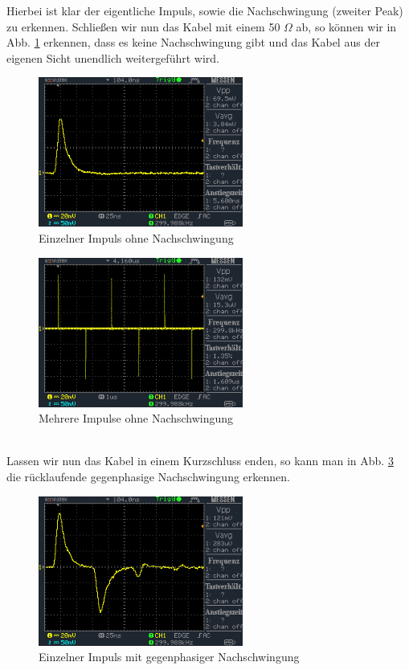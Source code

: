 \documentclass[a4paper,10pt]{article}
\numberwithin{equation}{section}
\begin{document}
Hierbei ist klar der eigentliche Impuls, sowie die Nachschwingung (zweiter Peak) zu erkennen.
\indent Schließen wir nun das Kabel mit einem 50 $\Omega$ ab, so können wir in Abb. \ref{fig:3.4} erkennen, dass es keine Nachschwingung gibt und das Kabel aus der eigenen Sicht unendlich weitergeführt wird. 
\begin{figure}[h]
        \centering
        \includegraphics[width=0.6\textwidth]{data/DS0019.BMP.png}
        \caption{Einzelner Impuls ohne Nachschwingung}
		\label{fig:3.4}
\end{figure}
\begin{figure}[h]
        \centering
        \includegraphics[width=0.6\textwidth]{data/DS0020.BMP.png}
        \caption{Mehrere Impulse ohne Nachschwingung}
		\label{fig:3.5}
\end{figure}\\
\indent Lassen wir nun das Kabel in einem Kurzschluss enden, so kann man in Abb. \ref{fig:3.6} die rücklaufende gegenphasige Nachschwingung erkennen.
\begin{figure}[h]
        \centering
        \includegraphics[width=0.6\textwidth]{data/DS0023.BMP.png}
        \caption{Einzelner Impuls mit gegenphasiger Nachschwingung}
		\label{fig:3.6}
\end{figure}
\end{document}
